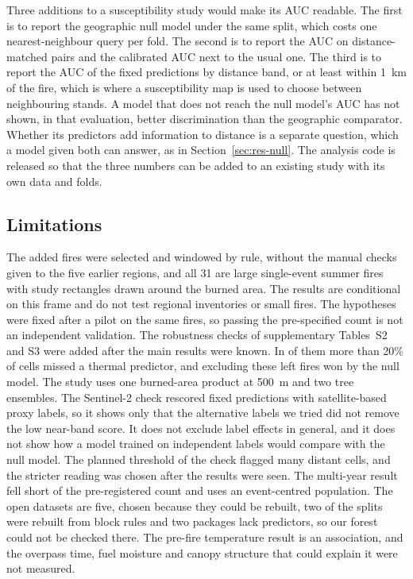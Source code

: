 \documentclass[preprint,12pt,authoryear]{elsarticle}
\begin{document}
Three additions to a susceptibility study would make its AUC readable. The first is to report the geographic null model under the same split, which costs one nearest-neighbour query per fold. The second is to report the AUC on distance-matched pairs and the calibrated AUC next to the usual one. The third is to report the AUC of the fixed predictions by distance band, or at least within 1~km of the fire, which is where a susceptibility map is used to choose between neighbouring stands. A model that does not reach the null model's AUC has not shown, in that evaluation, better discrimination than the geographic comparator. Whether its predictors add information to distance is a separate question, which a model given both can answer, as in Section~\ref{sec:res-null}. The analysis code is released so that the three numbers can be added to an existing study with its own data and folds.

\subsection{Limitations}
\label{sec:disc-limits}

The \vnAdded{} added fires were selected and windowed by rule, without the manual checks given to the five earlier regions, and all 31 are large single-event summer fires with study rectangles drawn around the burned area. The results are conditional on this frame and do not test regional inventories or small fires. The hypotheses were fixed after a pilot on the same fires, so passing the pre-specified count is not an independent validation. The robustness checks of supplementary Tables~S2 and S3 were added after the main results were known. In \vexclCount{} of them more than 20\% of cells missed a thermal predictor, and excluding these left \vexclNullWins{} fires won by the null model. The study uses one burned-area product at 500~m and two tree ensembles. The Sentinel-2 check rescored fixed predictions with satellite-based proxy labels, so it shows only that the alternative labels we tried did not remove the low near-band score. It does not exclude label effects in general, and it does not show how a model trained on independent labels would compare with the null model. The planned threshold of the check flagged many distant cells, and the stricter reading was chosen after the results were seen. The multi-year result fell short of the pre-registered count and uses an event-centred population. The open datasets are five, chosen because they could be rebuilt, two of the splits were rebuilt from block rules and two packages lack predictors, so our forest could not be checked there. The pre-fire temperature result is an association, and the overpass time, fuel moisture and canopy structure that could explain it were not measured.
\end{document}
